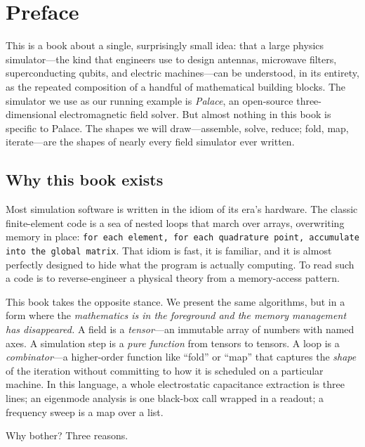 \chapter*{Preface}

This is a book about a single, surprisingly small idea: that a large physics
simulator---the kind that engineers use to design antennas, microwave filters,
superconducting qubits, and electric machines---can be understood, in its
entirety, as the repeated composition of a handful of mathematical building
blocks. The simulator we use as our running example is
\emph{Palace}, an open-source three-dimensional electromagnetic field solver.
But almost nothing in this book is specific to Palace. The shapes we will
draw---assemble, solve, reduce; fold, map, iterate---are the shapes of nearly
every field simulator ever written.

\section*{Why this book exists}

Most simulation software is written in the idiom of its era's hardware. The
classic finite-element code is a sea of nested loops that march over arrays,
overwriting memory in place: \texttt{for each element, for each quadrature
point, accumulate into the global matrix}. That idiom is fast, it is familiar,
and it is almost perfectly designed to hide what the program is actually
computing. To read such a code is to reverse-engineer a physical theory from a
memory-access pattern.

This book takes the opposite stance. We present the same algorithms, but in a
form where the \emph{mathematics is in the foreground and the memory management
has disappeared.} A field is a \emph{tensor}---an immutable array of numbers
with named axes. A simulation step is a \emph{pure function} from tensors to
tensors. A loop is a \emph{combinator}---a higher-order function like ``fold''
or ``map'' that captures the \emph{shape} of the iteration without committing to
how it is scheduled on a particular machine. In this language, a whole
electrostatic capacitance extraction is three lines; an eigenmode analysis is
one black-box call wrapped in a readout; a frequency sweep is a map over a list.

Why bother? Three reasons.

